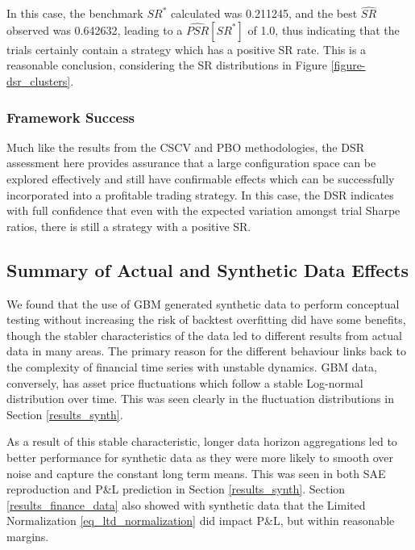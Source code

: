 \documentclass[a4paper,11pt,oneside]{article}
\theoremstyle{plain}
\theoremstyle{definition}
\begin{document}
	
	In this case, the benchmark $SR^*$ calculated was 0.211245, and the best $\widehat{SR}$ observed was 0.642632, leading to a $\widehat{PSR}[SR^*]$ of 1.0, thus indicating that the trials certainly contain a strategy which has a positive SR rate. This is a reasonable conclusion, considering the SR distributions in Figure \ref{figure-dsr_clusters}. \newline

	\subsubsection{Framework Success}
	
	Much like the results from the CSCV and PBO methodologies, the DSR assessment here provides assurance that a large configuration space can be explored effectively and still have confirmable effects which can be successfully incorporated into a profitable trading strategy. In this case, the DSR indicates with full confidence that even with the expected variation amongst trial Sharpe ratios, there is still a strategy with a positive SR.

	
	\newpage
	\subsection{Summary of Actual and Synthetic Data Effects}\label{results_synth_summary}
	
	We found that the use of GBM generated synthetic data to perform conceptual testing without increasing the risk of backtest overfitting did have some benefits, though the stabler characteristics of the data led to different results from actual data in many areas. The primary reason for the different behaviour links back to the complexity of financial time series with unstable dynamics. GBM data, conversely, has asset price fluctuations which follow a stable Log-normal distribution over time. This was seen clearly in the fluctuation distributions in Section \ref{results_synth}. \newline
	
	As a result of this stable characteristic, longer data horizon aggregations led to better performance for synthetic data as they were more likely to smooth over noise and capture the constant long term means. This was seen in both SAE reproduction and P\&L prediction in Section \ref{results_synth}. Section \ref{results_finance_data} also showed with synthetic data that the Limited Normalization \eqref{eq_ltd_normalization} did impact P\&L, but within reasonable margins.\newline
\end{document}
